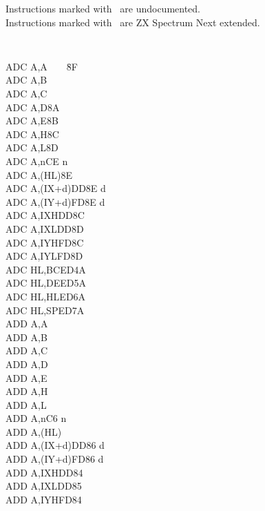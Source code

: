 Instructions marked with \UNDOC ~are undocumented.\\
Instructions marked with \ZXN ~are ZX Spectrum Next extended.
\setlength\columnsep{4em}
\begin{multicols}{3}
{
    \tt 
    \footnotesize
    \begin{tabbing}
        ADC A,A~~~~{\qquad}{\quad}\=8F\\
        ADC A,B\\
        ADC A,C\\
        ADC A,D\>8A\\
        ADC A,E\>8B\\
        ADC A,H\>8C\\
        ADC A,L\>8D\\
        ADC A,n\>CE n\\
        ADC A,(HL)\>8E\\
        ADC A,(IX+d)\>DD8E d\\
        ADC A,(IY+d)\>FD8E d\\
        ADC A,IXH\UNDOC\>DD8C\\
        ADC A,IXL\UNDOC\>DD8D\\
        ADC A,IYH\UNDOC\>FD8C\\
        ADC A,IYL\UNDOC\>FD8D\\
        ADC HL,BC\>ED4A\\
        ADC HL,DE\>ED5A\\
        ADC HL,HL\>ED6A\\
        ADC HL,SP\>ED7A\\
        ADD A,A\\
        ADD A,B\\
        ADD A,C\\
        ADD A,D\\
        ADD A,E\\
        ADD A,H\\
        ADD A,L\\
        ADD A,n\>C6 n\\
        ADD A,(HL)\\
        ADD A,(IX+d)\>DD86 d\\
        ADD A,(IY+d)\>FD86 d\\
        ADD A,IXH\UNDOC\>DD84\\
        ADD A,IXL\UNDOC\>DD85\\
        ADD A,IYH\UNDOC\>FD84\\

\end{tabbing}}
\end{multicols}
